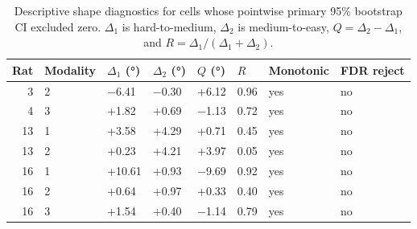 \begin{table}[htbp]
  \centering
  \caption{Descriptive shape diagnostics for cells whose pointwise primary 95\% bootstrap CI excluded zero. $\Delta_1$ is hard-to-medium, $\Delta_2$ is medium-to-easy, $Q=\Delta_2-\Delta_1$, and $R=\Delta_1/(\Delta_1+\Delta_2)$.}
  \label{tab:perceptual_bias_shape_diagnostics}
  \begin{tabular}{rlllllll}
    \toprule
    Rat & Modality & $\Delta_1$ (°) & $\Delta_2$ (°) & $Q$ (°) & $R$ & Monotonic & FDR reject \\
    \midrule
    3 & 2 & −6.41 & −0.30 & +6.12 & 0.96 & yes & no \\
    4 & 3 & +1.82 & +0.69 & −1.13 & 0.72 & yes & no \\
    13 & 1 & +3.58 & +4.29 & +0.71 & 0.45 & yes & no \\
    13 & 2 & +0.23 & +4.21 & +3.97 & 0.05 & yes & no \\
    16 & 1 & +10.61 & +0.93 & −9.69 & 0.92 & yes & no \\
    16 & 2 & +0.64 & +0.97 & +0.33 & 0.40 & yes & no \\
    16 & 3 & +1.54 & +0.40 & −1.14 & 0.79 & yes & no \\
    \bottomrule
  \end{tabular}
\end{table}
